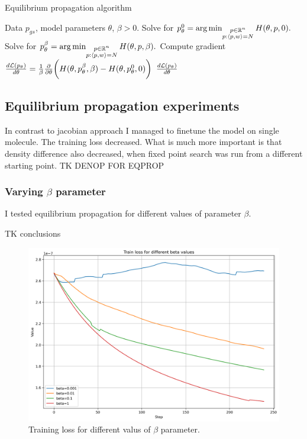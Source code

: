 \documentclass[a4paper,10pt]{report}
\begin{document}
\begin{algorithm}[H]
\caption{Equilibrium propagation algorithm}
\begin{algorithmic}[1]
\Require Data $p_{gs}$, model parameters $\theta$, $\beta>0$.
\State  Solve for $p_\theta^0  = \operatorname*{arg\,min}_{\substack{p \in \mathbb{R}^n \\ p: \langle p, w \rangle=N }} H(\theta, p, 0).$
\State Solve for $p_\theta^\beta  = \operatorname*{arg\,min}_{\substack{p \in \mathbb{R}^n \\ p: \langle p, w \rangle=N }} H(\theta, p, \beta).$
\State Compute gradient $\frac{d\mathcal{L}(p_\theta)}{d \theta} = \frac{1}{\beta} \frac{\partial }{\partial \theta} \bigg(H(\theta, p_\theta^\beta,\beta) - H(\theta, p_\theta^0, 0)\bigg)$
\State \Return $\frac{d\mathcal{L}(p_\theta)}{d \theta}$
\end{algorithmic}
\end{algorithm}


\subsection{Equilibrium propagation experiments}
In contrast to jacobian approach I managed to finetune the model on single molecule.
The training loss decreased. What is much more important is that density difference also decreased, when fixed point search was run from a different starting point.
TK DENOP FOR EQPROP
\subsubsection{Varying $\beta$ parameter}
I tested equilibrium propagation for different values of parameter $\beta$.

TK conclusions
\begin{figure}[H]
 \centering
 \includegraphics[scale=0.5]{images/train_loss_betas.png}
 \caption{Training loss for different valus of $\beta$ parameter.}
 \label{fig:betas}
\end{figure}
\end{document}
